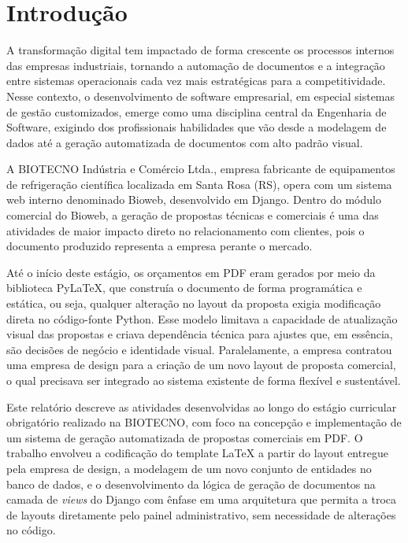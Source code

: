 
\chapter{Introdução}
\label{cap:introducao}

A transformação digital tem impactado de forma crescente os processos internos das empresas industriais,
tornando a automação de documentos e a integração entre sistemas operacionais cada vez mais estratégicas
para a competitividade. Nesse contexto, o desenvolvimento de software empresarial, em especial sistemas
de gestão customizados, emerge como uma disciplina central da Engenharia de Software, exigindo dos
profissionais habilidades que vão desde a modelagem de dados até a geração automatizada de documentos com
alto padrão visual.

A BIOTECNO Indústria e Comércio Ltda., empresa fabricante de equipamentos de refrigeração científica
localizada em Santa Rosa (RS), opera com um sistema web interno denominado Bioweb, desenvolvido em
Django. Dentro do módulo comercial do Bioweb, a geração de propostas técnicas e comerciais é uma das
atividades de maior impacto direto no relacionamento com clientes, pois o documento produzido representa
a empresa perante o mercado.

Até o início deste estágio, os orçamentos em PDF eram gerados por meio da biblioteca PyLaTeX, que
construía o documento de forma programática e estática, ou seja, qualquer alteração no layout da
proposta exigia modificação direta no código-fonte Python. Esse modelo limitava a capacidade de
atualização visual das propostas e criava dependência técnica para ajustes que, em essência, são decisões
de negócio e identidade visual. Paralelamente, a empresa contratou uma empresa de design para a criação
de um novo layout de proposta comercial, o qual precisava ser integrado ao sistema existente de forma
flexível e sustentável.

Este relatório descreve as atividades desenvolvidas ao longo do estágio curricular obrigatório realizado
na BIOTECNO, com foco na concepção e implementação de um sistema de geração automatizada de propostas
comerciais em PDF. O trabalho envolveu a codificação do template LaTeX a partir do layout entregue pela
empresa de design, a modelagem de um novo conjunto de entidades no banco de dados, e o desenvolvimento
da lógica de geração de documentos na camada de \textit{views} do Django com ênfase em uma arquitetura
que permita a troca de layouts diretamente pelo painel administrativo, sem necessidade de alterações no
código.

